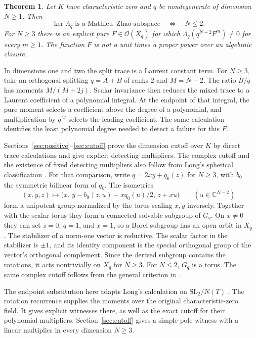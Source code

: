 \documentclass[11pt]{article}
\newtheorem{theorem}{Theorem}
\newcommand{\Lq}{\Lambda_q}
\begin{document}
\begin{theorem}\label{thm:main}
Let \(K\) have characteristic zero and \(q\) be nondegenerate of
dimension \(N\ge1\). Then
\[
   \boxed{\ker\Lq\text{ is a Mathieu--Zhao subspace}
          \quad\Longleftrightarrow\quad N\le2.}
\]
For \(N\ge3\) there is an explicit pure \(F\in\mathcal O(X_q)\) for
which \(\Lq(q^{N-2}F^m)\ne0\) for every \(m\ge1\). The function \(F\)
is not a unit times a proper power over an algebraic closure.
\end{theorem}

In dimensions one and two the split trace is a Laurent constant term.
For \(N\ge3\), take an orthogonal splitting \(q=A+B\) of ranks \(2\)
and \(M=N-2\). The ratio \(B/q\) has moments \(M/(M+2j)\).
Scalar invariance then reduces the mixed trace to a Laurent
coefficient of a polynomial integral. At the endpoint of that
integral, the pure moment selects a coefficient above the degree
of a polynomial, and multiplication by \(q^M\) selects the leading
coefficient. The same calculation identifies the least polynomial
degree needed to detect a failure for this \(F\).

Sections~\ref{sec:positive}--\ref{sec:cutoff} prove the dimension
cutoff over \(K\) by direct trace calculations and give explicit
detecting multipliers. The complex cutoff and the existence of
fixed detecting multipliers also follow from Long's spherical
classification \cite[Thm.~1.1]{Long}. For that comparison, write
\(q=2xy+q_0(z)\) for \(N\ge3\), with \(b_0\) the symmetric bilinear
form of \(q_0\). The isometries
\[
 (x,y,z)\longmapsto
 \bigl(x,\,y-b_0(z,u)-xq_0(u)/2,\,z+xu\bigr)
 \qquad(u\in\mathbb C^{N-2})
\]
form a unipotent group normalized by the torus scaling \(x,y\)
inversely. Together with the scalar torus they form a connected
solvable subgroup of \(G_q\). On \(x\ne0\) they can set \(z=0\),
\(q=1\), and \(x=1\), so a Borel subgroup has an open orbit in \(X_q\).
The stabilizer of a norm-one vector is reductive. The scalar factor in
the stabilizer is \(\pm1\), and its identity component is the special
orthogonal group of the vector's orthogonal complement. Since the
derived subgroup contains the rotations, it acts nontrivially on
\(X_q\) for \(N\ge3\). For \(N\le2\), \(G_q\) is a torus.
The same complex cutoff follows from the general criterion in
\cite[Thm.~1.1]{vanRijn}.

The endpoint substitution here adapts Long's calculation on
\(\mathrm{SL}_2/N(T)\) \cite[Prop.~5.1]{Long}. The rotation recurrence
supplies the moments over the original characteristic-zero field.
It gives explicit witnesses there, as well as the exact cutoff for
their polynomial multipliers. Section~\ref{sec:cutoff} gives a simple-pole witness with a linear multiplier in every dimension \(N\ge3\).
\end{document}

